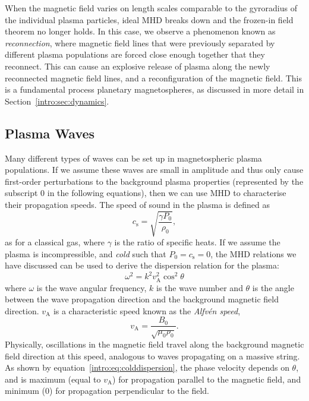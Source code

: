 When the magnetic field varies on length scales comparable to the gyroradius of the individual plasma particles, ideal MHD breaks down and the frozen-in field theorem no longer holds. In this case, we observe a phenomenon known as \textit{reconnection}, where magnetic field lines that were previously separated by different plasma populations are forced close enough together that they reconnect. This can cause an explosive release of plasma along the newly reconnected magnetic field lines, and a reconfiguration of the magnetic field. This is a fundamental process planetary magnetospheres, as discussed in more detail in Section~\ref{intro:sec:dynamics}. 

\subsection{Plasma Waves}
Many different types of waves can be set up in magnetospheric plasma populations. If we assume these waves are small in amplitude and thus only cause first-order perturbations to the background plasma properties (represented by the subscript 0 in the following equations), then we can use MHD to characterise their propagation speeds. The speed of sound in the plasma is defined as
\begin{equation}
c_\mathrm{s} = \sqrt{\frac{\gamma P_0}{\rho_0}},
\end{equation}
as for a classical gas, where $\gamma$ is the ratio of specific heats. If we assume the plasma is incompressible, and \textit{cold} such that $P_0 = c_\mathrm{s} = 0$, the MHD relations we have discussed can be used to derive the dispersion relation for the plasma:
\begin{equation}\label{intro:eq:colddispersion}
\omega^2 = k^2{v}_\mathrm{A}^2\cos^2{\theta}
\end{equation}
where $\omega$ is the wave angular frequency, $k$ is the wave number and $\theta$ is the angle between the wave propagation direction and the background magnetic field direction. $v_\mathrm{A}$ is a characteristic speed known as the \textit{Alfv\'en speed},
\begin{equation}
v_\mathrm{A} = \frac{B_0}{\sqrt{\mu_0\rho_0}}.
\end{equation}
Physically, oscillations in the magnetic field travel along the background magnetic field direction at this speed, analogous to waves propagating on a massive string. As shown by equation~\ref{intro:eq:colddispersion}, the phase velocity depends on $\theta$, and is maximum (equal to $v_\mathrm{A}$) for propagation parallel to the magnetic field, and minimum (0) for propagation perpendicular to the field. 

